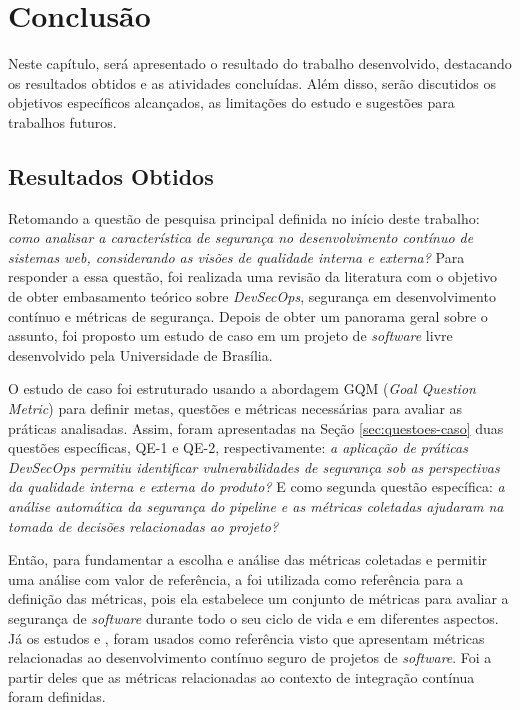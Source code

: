 \chapter[Conclusão]{Conclusão}

Neste capítulo, será apresentado o resultado do trabalho desenvolvido, destacando os resultados obtidos e as atividades concluídas. Além disso, serão discutidos os objetivos específicos alcançados, as limitações do estudo e sugestões para trabalhos futuros.

\section{Resultados Obtidos}

Retomando a questão de pesquisa principal definida no início deste trabalho: \textit{como analisar a característica de segurança no desenvolvimento contínuo de sistemas \textit{web}, considerando as visões de qualidade interna e externa?}
Para responder a essa questão, foi realizada uma revisão da literatura com o objetivo de obter embasamento teórico sobre \textit{DevSecOps}, segurança em desenvolvimento contínuo e métricas de segurança. Depois de obter um panorama geral sobre o assunto, foi proposto um estudo de caso em um projeto de \textit{software} livre desenvolvido pela Universidade de Brasília.

O estudo de caso foi estruturado usando a abordagem GQM (\textit{Goal Question Metric}) para definir metas, questões e métricas necessárias para avaliar as práticas analisadas. Assim, foram apresentadas na Seção \ref{sec:questoes-caso} duas questões específicas, QE-1 e QE-2, respectivamente: \textit{a aplicação de práticas \textit{DevSecOps} permitiu identificar vulnerabilidades de segurança sob as perspectivas da qualidade interna e externa do produto?}
E como segunda questão específica: \textit{a análise automática da segurança do \textit{pipeline} e as métricas coletadas ajudaram na tomada de decisões relacionadas ao projeto?}

Então, para fundamentar a escolha e análise das métricas coletadas e permitir uma análise com valor de referência, a  foi utilizada como referência para a definição das métricas, pois ela estabelece um conjunto de métricas para avaliar a segurança de \textit{software} durante todo o seu ciclo de vida e em diferentes aspectos. Já os estudos  e , foram usados como referência visto que apresentam métricas relacionadas ao desenvolvimento contínuo seguro de projetos de \textit{software}. Foi a partir deles que as métricas relacionadas ao contexto de integração contínua foram definidas.

